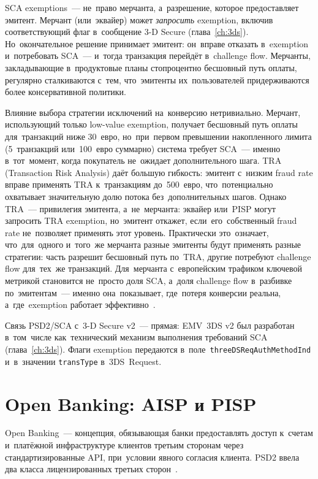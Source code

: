 \begin{important}
  SCA exemptions~--- не~право мерчанта, а~разрешение, которое предоставляет
  эмитент. Мерчант (или~эквайер) может \emph{запросить} exemption,
  включив соответствующий флаг в~сообщение 3-D Secure (глава~\ref{ch:3ds}).
  Но~окончательное решение принимает эмитент: он~вправе отказать
  в~exemption и~потребовать SCA~--- и~тогда транзакция перейдёт
  в~challenge flow. Мерчанты, закладывающие в~продуктовые планы
  стопроцентно бесшовный путь оплаты, регулярно сталкиваются с~тем, что~эмитенты
  их~пользователей придерживаются более консервативной политики.
\end{important}

Влияние выбора стратегии исключений на~конверсию нетривиально.
Мерчант, использующий только low-value exemption, получает бесшовный
путь оплаты для~транзакций ниже 30~евро, но~при~первом превышении накопленного
лимита (5~транзакций или~100~евро суммарно) система требует SCA~---
именно в~тот~момент, когда покупатель не~ожидает дополнительного шага.
TRA (Transaction Risk Analysis) даёт большую гибкость: эмитент с~низким
fraud rate вправе применять TRA к~транзакциям до~500~евро, что~потенциально
охватывает значительную долю потока без~дополнительных шагов. Однако TRA~--- привилегия
эмитента, а~не~мерчанта: эквайер или~PISP могут запросить TRA exemption,
но~эмитент откажет, если~его~собственный fraud rate не~позволяет применять
этот уровень. Практически это~означает, что~для~одного и~того~же мерчанта
разные эмитенты будут применять разные стратегии: часть разрешит
бесшовный путь по~TRA, другие потребуют challenge flow для~тех~же транзакций.
Для~мерчанта с~европейским трафиком ключевой метрикой становится
не~просто доля SCA, а~доля challenge flow в~разбивке по~эмитентам~---
именно она~показывает, где~потеря конверсии реальна, а~где~exemption
работает эффективно~.

Связь PSD2/SCA с~3-D Secure v2~--- прямая: EMV~3DS v2 был разработан
в~том~числе как~технический механизм выполнения требований SCA
(глава~\ref{ch:3ds}). Флаги exemption передаются в~поле~\texttt{threeDSReqAuthMethodInd}
и~в~значении \texttt{transType} в~3DS~Request.


\section{Open Banking: AISP и PISP}
\label{sec:open-banking}

Open Banking~--- концепция, обязывающая банки предоставлять доступ
к~счетам и~платёжной инфраструктуре клиентов третьим сторонам через
стандартизированные API, при~условии явного согласия клиента. PSD2
ввела два класса лицензированных третьих сторон~.

